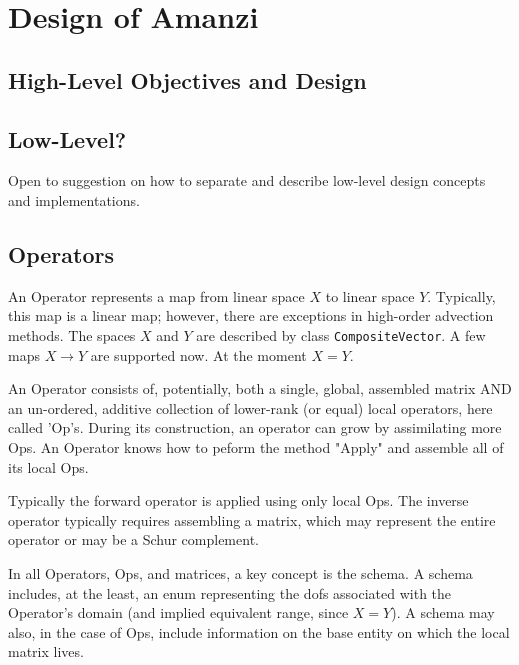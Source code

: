 %
%

\section{Design of Amanzi}

\subsection{High-Level Objectives and Design}

\subsection{Low-Level?}

Open to suggestion on how to separate and describe low-level design
concepts and implementations.

\subsection{Operators}
An Operator represents a map from linear space $X$ to linear space $Y$.
Typically, this map is a linear map; however, there are exceptions in
high-order advection methods. The spaces $X$ and $Y$ are described 
by class {\tt CompositeVector}. 
A few maps $X \to Y$ are supported now.
At the moment $X = Y$.

An Operator consists of, potentially, both a single, global, assembled
matrix AND an un-ordered, additive collection of lower-rank (or equal) 
local operators, here called 'Op's. During its construction, an operator
can grow by assimilating more Ops. An Operator knows how to peform 
the method "Apply" and assemble all of its local Ops.

Typically the forward operator is applied using only local Ops.
The inverse operator typically requires assembling a matrix, which 
may represent the entire operator or may be a Schur complement.

In all Operators, Ops, and matrices, a key concept is the schema. 
A schema includes, at the least, an enum representing the dofs associated
with the Operator's domain (and implied equivalent range, since $X=Y$).
A schema may also, in the case of Ops, include information on the base
entity on which the local matrix lives.

